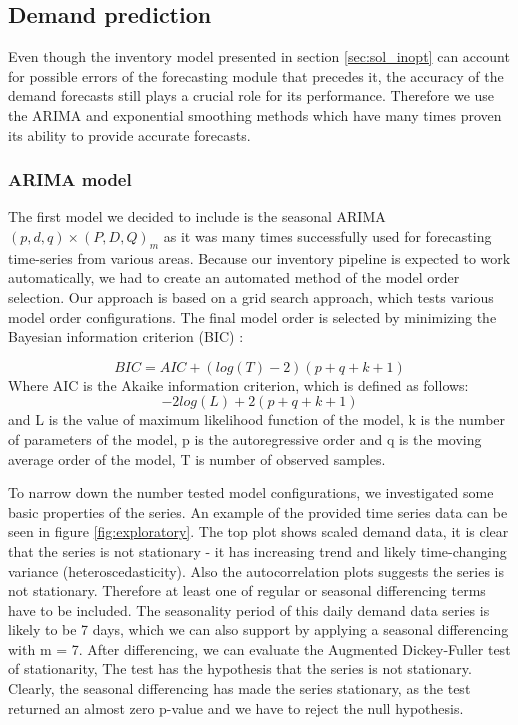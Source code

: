 \documentclass[11pt,a4paper]{article}
\begin{document}
\subsection{Demand prediction}
\label{sec:approach_prediction}
Even though the inventory model presented in section \ref{sec:sol_inopt} can account for possible errors of the forecasting module that precedes it, the accuracy of the demand forecasts still plays a crucial role for its performance. Therefore we use the ARIMA and exponential smoothing methods which have many times proven its ability to provide accurate forecasts.
\subsubsection{ARIMA model}
The first model we decided to include is the seasonal ARIMA$(p,d,q)\times(P,D,Q)_m$ as it was many times successfully used for forecasting time-series from various areas. 
Because our inventory pipeline is expected to work automatically, we had to create an automated method of the model order selection. Our approach is based on a grid search approach, which tests various model order configurations. The final model order is selected by minimizing the Bayesian information criterion (BIC) \cite{hyndman2014forecasting}:

\begin{equation}
BIC = AIC + (log(T) -2)(p+q+k+1)
\end{equation}
Where AIC is the Akaike information criterion, which is defined as follows:
\begin{equation}
-2log(L) + 2(p+q+k+1)
\end{equation}
and L is the value of maximum likelihood function of the model, k is the number of parameters of the model, p is the autoregressive order and q is the moving average order of the model, T is number of observed samples.

To narrow down the number tested model configurations, we investigated some basic properties of the series. An example of the provided time series data can be seen in figure \ref{fig:exploratory}. The top plot shows scaled demand data, it is clear that the series is not stationary - it has increasing trend and likely time-changing variance (heteroscedasticity). Also the autocorrelation plots suggests the series is not stationary. Therefore at least one of regular or seasonal differencing terms have to be included. The seasonality period of this daily demand data series is likely to be 7 days, which we can also support by applying a seasonal differencing with m = 7. After differencing, we can evaluate the Augmented Dickey-Fuller test of stationarity, The test has the hypothesis that the series is not stationary. Clearly, the seasonal differencing has made the series stationary, as the test returned an almost zero p-value and we have to reject the null hypothesis.
\end{document}
